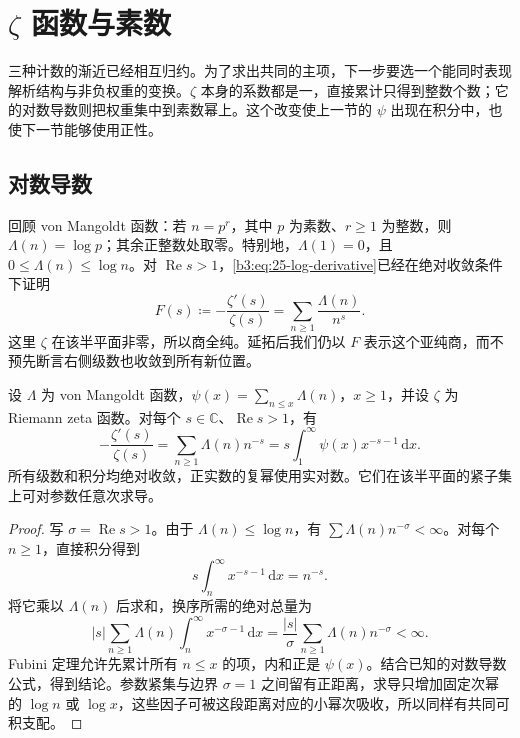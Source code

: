 \section{\texorpdfstring{\(\zeta\)}{\AnalysisPdfZeta} 函数与素数}
\label{b3:sec:2702}

三种计数的渐近已经相互归约。为了求出共同的主项，下一步要选一个能同时表现解析结构与非负权重的变换。\(\zeta\) 本身的系数都是一，直接累计只得到整数个数；它的对数导数则把权重集中到素数幂上。这个改变使上一节的 \(\psi\) 出现在积分中，也使下一节能够使用正性。

\subsection{对数导数}
\label{b3:subsec:270201}

回顾 von Mangoldt 函数：若 \(n=p^r\)，其中 \(p\) 为素数、\(r\ge1\) 为整数，则 \(\Lambda(n)=\log p\)；其余正整数处取零。特别地，\(\Lambda(1)=0\)，且 \(0\le\Lambda(n)\le\log n\)。对 \(\operatorname{Re}s>1\)，\eqref{b3:eq:25-log-derivative}已经在绝对收敛条件下证明
\[
 F(s)\coloneqq-\frac{\zeta'(s)}{\zeta(s)}
 =\sum_{n\ge1}\frac{\Lambda(n)}{n^s}.
\]
这里 \(\zeta\) 在该半平面非零，所以商全纯。延拓后我们仍以 \(F\) 表示这个亚纯商，而不预先断言右侧级数也收敛到所有新位置。

\begin{proposition}[素数幂计数的积分变换]\label{b3:prop:27-counting-transform}
设 \(\Lambda\) 为 von Mangoldt 函数，\(\psi(x)=\sum_{n\le x}\Lambda(n)\)，\(x\ge1\)，并设 \(\zeta\) 为 Riemann zeta 函数。对每个 \(s\in\mathbb C\)、\(\operatorname{Re}s>1\)，有
\begin{equation}\label{b3:eq:27-counting-transform}
 -\frac{\zeta'(s)}{\zeta(s)}
 =\sum_{n\ge1}\Lambda(n)n^{-s}
 =s\int_1^\infty\psi(x)x^{-s-1}\,\mathrm dx.
\end{equation}
所有级数和积分均绝对收敛，正实数的复幂使用实对数。它们在该半平面的紧子集上可对参数任意次求导。
\end{proposition}
\begin{proof}
写 \(\sigma=\operatorname{Re}s>1\)。由于 \(\Lambda(n)\le\log n\)，有 \(\sum\Lambda(n)n^{-\sigma}<\infty\)。对每个 \(n\ge1\)，直接积分得到
\[
 s\int_n^\infty x^{-s-1}\,\mathrm dx=n^{-s}.
\]
将它乘以 \(\Lambda(n)\) 后求和，换序所需的绝对总量为
\[
 |s|\sum_{n\ge1}\Lambda(n)\int_n^\infty x^{-\sigma-1}\,\mathrm dx
 =\frac{|s|}{\sigma}\sum_{n\ge1}\Lambda(n)n^{-\sigma}<\infty.
\]
Fubini 定理允许先累计所有 \(n\le x\) 的项，内和正是 \(\psi(x)\)。结合已知的对数导数公式，得到结论。参数紧集与边界 \(\sigma=1\) 之间留有正距离，求导只增加固定次幂的 \(\log n\) 或 \(\log x\)，这些因子可被这段距离对应的小幂次吸收，所以同样有共同可积支配。
\end{proof}

